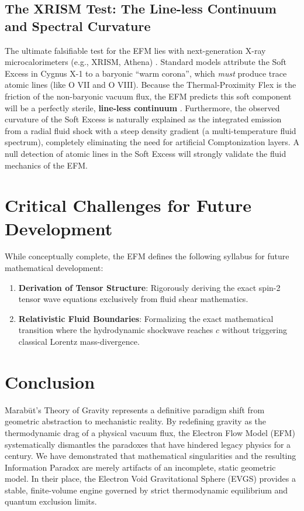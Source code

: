 \documentclass[11pt, a4paper]{article}
\begin{document}
\subsection{The XRISM Test: The Line-less Continuum and Spectral Curvature}
The ultimate falsifiable test for the EFM lies with next-generation X-ray microcalorimeters (e.g., XRISM, Athena) \cite{xrism2020}. Standard models attribute the Soft Excess in Cygnus X-1 to a baryonic ``warm corona'', which \textit{must} produce trace atomic lines (like O VII and O VIII). Because the Thermal-Proximity Flex is the friction of the non-baryonic vacuum flux, the EFM predicts this soft component will be a perfectly sterile, \textbf{line-less continuum} \cite{gierlinski2004}. Furthermore, the observed curvature of the Soft Excess is naturally explained as the integrated emission from a radial fluid shock with a steep density gradient (a multi-temperature fluid spectrum), completely eliminating the need for artificial Comptonization layers. A null detection of atomic lines in the Soft Excess will strongly validate the fluid mechanics of the EFM.

\section{Critical Challenges for Future Development}
While conceptually complete, the EFM defines the following syllabus for future mathematical development:
\begin{enumerate}
  \item \textbf{Derivation of Tensor Structure}: Rigorously deriving the exact spin-2 tensor wave equations exclusively from fluid shear mathematics.
  \item \textbf{Relativistic Fluid Boundaries}: Formalizing the exact mathematical transition where the hydrodynamic shockwave reaches $c$ without triggering classical Lorentz mass-divergence.
\end{enumerate}

\section{Conclusion}
Marab\={u}t's Theory of Gravity represents a definitive paradigm shift from geometric abstraction to mechanistic reality. By redefining gravity as the thermodynamic drag of a physical vacuum flux, the Electron Flow Model (EFM) systematically dismantles the paradoxes that have hindered legacy physics for a century. We have demonstrated that mathematical singularities and the resulting Information Paradox are merely artifacts of an incomplete, static geometric model. In their place, the Electron Void Gravitational Sphere (EVGS) provides a stable, finite-volume engine governed by strict thermodynamic equilibrium and quantum exclusion limits.
\end{document}
